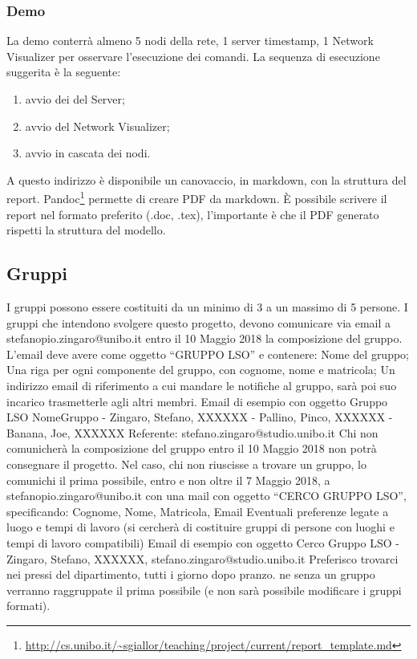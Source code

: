 \documentclass{article}
\begin{document}
\subsubsection{Demo}
La demo conterrà almeno 5 nodi della rete, 1 server timestamp, 1 Network Visualizer per osservare l'esecuzione dei comandi.
La sequenza di esecuzione suggerita è la seguente:
\begin{enumerate}
    \item avvio dei del Server;
    \item avvio del Network Visualizer;
    \item avvio in cascata dei nodi.
\end{enumerate}
A questo indirizzo è disponibile un canovaccio, in markdown, con la struttura del report. 
Pandoc\footnote{\url{http://cs.unibo.it/~sgiallor/teaching/project/current/report_template.md}} permette di creare PDF da markdown. 
È possibile scrivere il report nel formato preferito (.doc, .tex), l'importante è che il PDF generato rispetti la struttura del modello.
%
\subsection{Gruppi}
%
I gruppi possono essere costituiti da un minimo di 3 a un massimo di 5 persone. 
\newline
I gruppi che intendono svolgere questo progetto, devono comunicare via email a stefanopio.zingaro@unibo.it entro il 10 Maggio 2018 la composizione del gruppo. 
\newline
L'email deve avere come oggetto “GRUPPO LSO” e contenere:
Nome del gruppo;
Una riga per ogni componente del gruppo, con cognome, nome e matricola;
Un indirizzo email di riferimento a cui mandare le notifiche al gruppo, sarà poi suo incarico trasmetterle agli altri membri. 
Email di esempio con oggetto Gruppo LSO
NomeGruppo
- Zingaro, Stefano, XXXXXX
- Pallino, Pinco, XXXXXX
- Banana, Joe, XXXXXX
Referente: stefano.zingaro@studio.unibo.it
\newline
Chi non comunicherà la composizione del gruppo entro il 10 Maggio 2018 non potrà consegnare il progetto.
\newline
Nel caso, chi non riuscisse a trovare un gruppo, lo comunichi il prima possibile, entro e non oltre il 7 Maggio 2018, a stefanopio.zingaro@unibo.it con una mail con oggetto “CERCO GRUPPO LSO”, specificando:
Cognome, Nome, Matricola, Email 
Eventuali preferenze legate a luogo e tempi di lavoro (si cercherà di costituire gruppi di persone con luoghi e tempi di lavoro compatibili)
Email di esempio con oggetto Cerco Gruppo LSO 
\newline
- Zingaro, Stefano, XXXXXX, stefano.zingaro@studio.unibo.it
\newline
Preferisco trovarci nei pressi del dipartimento, tutti i giorno dopo pranzo.
\newline
ne senza un gruppo verranno raggruppate il prima possibile (e non sarà possibile modificare i gruppi formati).
%
\end{document}
